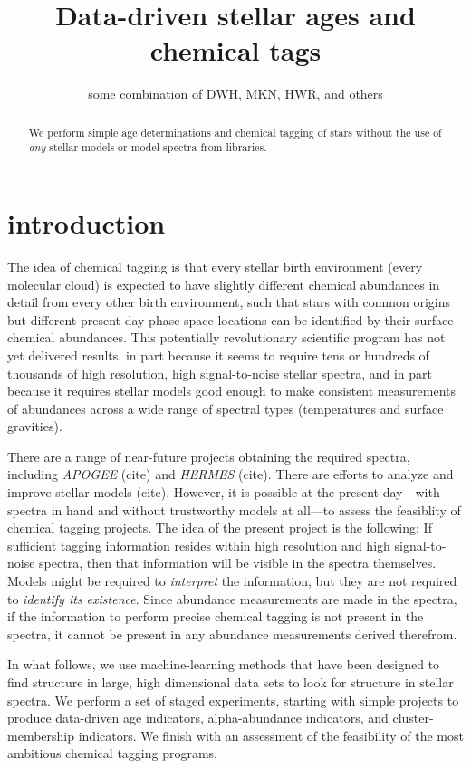 \documentclass[12pt, preprint]{aastex}
\newcommand{\project}[1]{\textsl{#1}}
\begin{document}
\title{Data-driven stellar ages and chemical tags}
\author{
  some combination of DWH, MKN, HWR, and others
}

\begin{abstract}
We perform simple age determinations and chemical tagging of stars
without the use of \emph{any} stellar models or model spectra from
libraries.
\end{abstract}

\section{introduction}

The idea of chemical tagging is that every stellar birth environment
(every molecular cloud) is expected to have slightly different
chemical abundances in detail from every other birth environment, such
that stars with common origins but different present-day phase-space
locations can be identified by their surface chemical abundances.
This potentially revolutionary scientific program has not yet
delivered results, in part because it seems to require tens or
hundreds of thousands of high resolution, high signal-to-noise stellar
spectra, and in part because it requires stellar models good enough to
make consistent measurements of abundances across a wide range of
spectral types (temperatures and surface gravities).

There are a range of near-future projects obtaining the required
spectra, including \project{APOGEE} (cite) and \project{HERMES}
(cite).  There are efforts to analyze and improve stellar models
(cite).  However, it is possible at the present day---with spectra in
hand and without trustworthy models at all---to assess the feasiblity
of chemical tagging projects.  The idea of the present project is the
following: If sufficient tagging information resides within high
resolution and high signal-to-noise spectra, then that information
will be visible in the spectra themselves.  Models might be required
to \emph{interpret} the information, but they are not required to
\emph{identify its existence}.  Since abundance measurements are made
in the spectra, if the information to perform precise chemical tagging
is not present in the spectra, it cannot be present in any abundance
measurements derived therefrom.

In what follows, we use machine-learning methods that have been
designed to find structure in large, high dimensional data sets to
look for structure in stellar spectra.  We perform a set of staged
experiments, starting with simple projects to produce data-driven age
indicators, alpha-abundance indicators, and cluster-membership
indicators.  We finish with an assessment of the feasibility of the
most ambitious chemical tagging programs.
\end{document}
